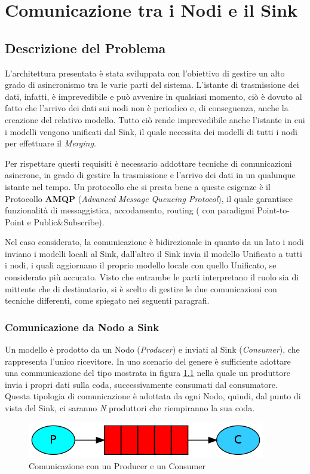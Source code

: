 \chapter{Comunicazione tra i Nodi e il Sink}
  \section{Descrizione del Problema}
    L'architettura presentata è stata sviluppata con l'obiettivo di gestire un alto grado di asincronismo tra le varie parti del sistema. L'istante di trasmissione dei dati, infatti, è imprevedibile e può avvenire in qualsiasi momento, ciò è dovuto al fatto che l'arrivo dei dati sui nodi non è periodico e, di conseguenza, anche la creazione del relativo modello. Tutto ciò rende imprevedibile anche l'istante in cui i modelli vengono unificati dal Sink, il quale necessita dei modelli di tutti i nodi per effettuare il \textit{Merging}.  \newline

    Per rispettare questi requisiti è necessario addottare tecniche di comunicazioni asincrone, in grado di gestire la trasmissione e l'arrivo dei dati in un qualunque istante nel tempo. Un protocollo che si presta bene a queste esigenze è il Protocollo \textbf{AMQP} (\textit{Advanced Message Queueing Protocol}), il quale garantisce funzionalità di messaggistica, accodamento, routing ( con paradigmi Point-to-Point e Public\&Subscribe). \newline

    Nel caso considerato, la comunicazione è bidirezionale in quanto da un lato i nodi inviano i modelli locali al Sink, dall'altro il Sink invia il modello Unificato a tutti i nodi, i quali aggiornano il proprio modello locale con quello Unificato, se considerato più accurato. Visto che entrambe le parti interpretano il ruolo sia di mittente che di destinatario, si è scelto di gestire le due comunicazioni con tecniche differenti, come spiegato nei seguenti paragrafi.
    \subsection{Comunicazione da Nodo a Sink}
      Un modello è prodotto da un Nodo (\textit{Producer}) e inviati al Sink (\textit{Consumer}), che rappresenta l'unico ricevitore. In uno scenario del genere è sufficiente adottare una communicazione del tipo mostrata in figura \ref{fig:ProducerConsumer} nella quale un produttore invia i propri dati sulla coda, successivamente consumati dal consumatore. Questa tipologia di comunicazione è adottata da ogni Nodo, quindi, dal punto di vista del Sink, ci saranno \textit{N} produttori che riempiranno la sua coda.
      \begin{figure}[h!]
        \centering
        \includegraphics[scale=0.7]{../Immagini/ProducerConsumer.png}
        \caption{Comunicazione con un Producer e un Consumer}
        \label{fig:ProducerConsumer}
      \end{figure}

